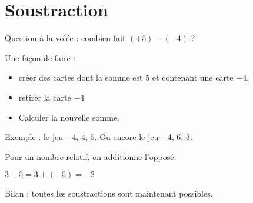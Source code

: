 \section{Soustraction}

Question à la volée : combien fait \( (+5)-(-4)  \) ?

Une façon de faire : 
\begin{itemize}
    \item 
créer des cartes dont la somme est \( 5\) et contenant une carte \( -4\).
\item
    retirer la carte \( -4\)
\item 
    Calculer la nouvelle somme.
\end{itemize}
Exemple : le jeu \( -4\), \( 4\), \( 5\). Ou encore le jeu \( -4\), \( 6\), \( 3\).


\begin{definition}
    Pour  un nombre relatif, on additionne l'opposé.
\end{definition}

\begin{example}
    \( 3-5=3+(-5)=-2\)
\end{example}

Bilan : toutes les soustractions sont maintenant possibles.



